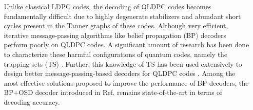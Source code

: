 \documentclass[%
 reprint,
 amsmath,amssymb,
 aps,
pra,
showkeys,
]{revtex4-2}
\begin{document}
Unlike classical LDPC codes, the decoding of QLDPC codes becomes fundamentally difficult due to highly degenerate stabilizers and abundant short cycles present in the Tanner graphs of these codes.
Although very efficient, iterative message-passing algorithms like belief propagation (BP) decoders perform poorly on QLDPC codes.
A significant amount of research has been done to characterize these harmful configurations of quantum codes, namely the trapping sets (TS) \cite{raveendran2021trapping}.
Further, this knowledge of TS has been used extensively to design better message-passing-based decoders for QLDPC codes \cite{pradhan2023learning,liu2019neural,gong2024graph}.
Among the most effective solutions proposed to improve the performance of BP decoders, the BP+OSD decoder introduced in Ref. \cite{panteleev2021degenerate} remains state-of-the-art in terms of decoding accuracy. 
\end{document}
